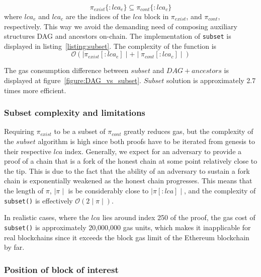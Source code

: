 \[ \pi_{exist}\{:lca_{e}\} \subseteq \pi_{cont}\{:lca_{c}\} \]
where $lca_{e}$ and $lca_{c}$ are the indices of the $lca$ block in
$\pi_{exist}$, and $\pi_{cont}$, respectively. This way we avoid
the demanding need of composing auxiliary structures DAG and ancestors
on-chain. The implementation of \texttt{subset} is displayed in
listing~\ref{listing:subset}. The complexity of the function is
\[ \mathcal{O}(\mid\pi_{exist}[:lca_{e}]\mid + \mid\pi_{cont}[:lca_{c}]\mid) \]





The gas consumption difference between $subset$ and $DAG + ancestors$ is
displayed at figure~\ref{figure:DAG_vs_subset}. $Subset$ solution is
approximately 2.7 times more efficient.



\subsubsection{Subset complexity and limitations} Requiring $\pi_{exist}$ to be a subset of
$\pi_{cont}$ greatly reduces gas, but the complexity of the $subset$ algorithm
is high since both proofs have to be iterated from genesis to their respective
$lca$ index. Generally, we expect for an adversary to provide a proof of a
chain that is a fork of the honest chain at some point relatively close to the
tip. This is due to the fact that the ability of an adversary to sustain a fork
chain is exponentially weakened as the honest chain progresses.  This means
that the length of $\pi$, $\mid\pi\mid$ is be considerably close to
$\mid\pi[:lca]\mid$, and the complexity of \texttt{subset()} is effectively
$\mathcal{O}(2\mid\pi\mid)$.

In realistic cases, where the $lca$ lies around index 250 of the proof, the gas
cost of \texttt{subset()} is approximately 20,000,000 gas units, which makes it
inapplicable for real blockchains since it exceeds the block gas limit of
the Ethereum blockchain by far.

\subsubsection{Position of block of interest}

